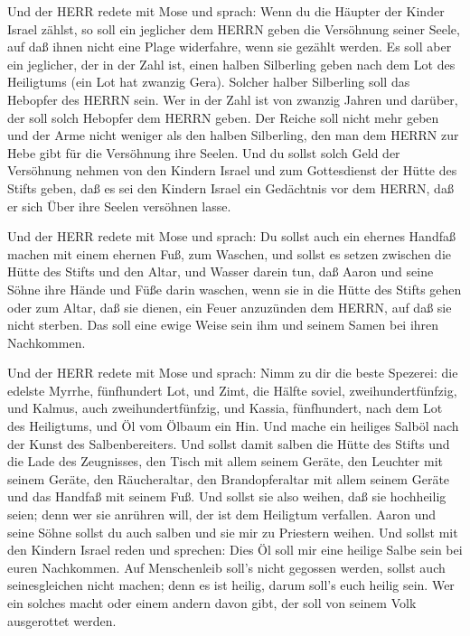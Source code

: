  Und der HERR redete mit Mose und sprach: 
Wenn du die Häupter der Kinder Israel zählst, so soll ein jeglicher dem
HERRN geben die Versöhnung seiner Seele, auf daß ihnen nicht eine Plage
widerfahre, wenn sie gezählt werden.  Es soll aber ein
jeglicher, der in der Zahl ist, einen halben Silberling geben nach dem
Lot des Heiligtums (ein Lot hat zwanzig Gera). Solcher halber Silberling
soll das Hebopfer des HERRN sein.  Wer in der Zahl ist von
zwanzig Jahren und darüber, der soll solch Hebopfer dem HERRN geben.
 Der Reiche soll nicht mehr geben und der Arme nicht
weniger als den halben Silberling, den man dem HERRN zur Hebe gibt für
die Versöhnung ihre Seelen.  Und du sollst solch Geld der
Versöhnung nehmen von den Kindern Israel und zum Gottesdienst der Hütte
des Stifts geben, daß es sei den Kindern Israel ein Gedächtnis vor dem
HERRN, daß er sich Über ihre Seelen versöhnen lasse.

 Und der HERR redete mit Mose und sprach:  Du
sollst auch ein ehernes Handfaß machen mit einem ehernen Fuß, zum
Waschen, und sollst es setzen zwischen die Hütte des Stifts und den
Altar, und Wasser darein tun,  daß Aaron und seine Söhne
ihre Hände und Füße darin waschen,  wenn sie in die Hütte
des Stifts gehen oder zum Altar, daß sie dienen, ein Feuer anzuzünden
dem HERRN,  auf daß sie nicht sterben. Das soll eine ewige
Weise sein ihm und seinem Samen bei ihren Nachkommen.

 Und der HERR redete mit Mose und sprach: 
Nimm zu dir die beste Spezerei: die edelste Myrrhe, fünfhundert Lot, und
Zimt, die Hälfte soviel, zweihundertfünfzig, und Kalmus, auch
zweihundertfünfzig,  und Kassia, fünfhundert, nach dem Lot
des Heiligtums, und Öl vom Ölbaum ein Hin.  Und mache ein
heiliges Salböl nach der Kunst des Salbenbereiters.  Und
sollst damit salben die Hütte des Stifts und die Lade des Zeugnisses,
 den Tisch mit allem seinem Geräte, den Leuchter mit seinem
Geräte, den Räucheraltar,  den Brandopferaltar mit allem
seinem Geräte und das Handfaß mit seinem Fuß.  Und sollst
sie also weihen, daß sie hochheilig seien; denn wer sie anrühren will,
der ist dem Heiligtum verfallen.  Aaron und seine Söhne
sollst du auch salben und sie mir zu Priestern weihen.  Und
sollst mit den Kindern Israel reden und sprechen: Dies Öl soll mir eine
heilige Salbe sein bei euren Nachkommen.  Auf Menschenleib
soll's nicht gegossen werden, sollst auch seinesgleichen nicht machen;
denn es ist heilig, darum soll's euch heilig sein.  Wer ein
solches macht oder einem andern davon gibt, der soll von seinem Volk
ausgerottet werden.

